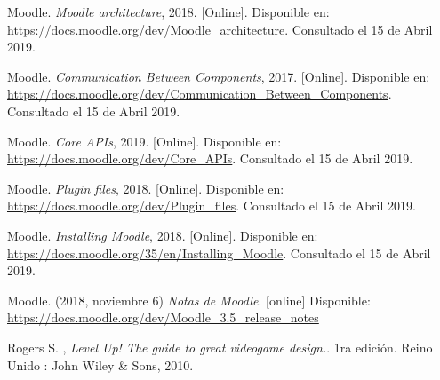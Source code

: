 \begin{thebibliography}{9}
        Moodle. {\it Moodle architecture}, 2018. [Online]. Disponible en:
        \url{https://docs.moodle.org/dev/Moodle_architecture}. Consultado el 15 de Abril 2019.
    
        Moodle. {\it Communication Between Components}, 2017. [Online]. Disponible en:
        \url{https://docs.moodle.org/dev/Communication_Between_Components}. Consultado el 15 de Abril 2019.
    
        Moodle. {\it Core APIs}, 2019. [Online]. Disponible en:
        \url{https://docs.moodle.org/dev/Core_APIs}. Consultado el 15 de Abril 2019.
    
        Moodle. {\it Plugin files}, 2018. [Online]. Disponible en:
        \url{https://docs.moodle.org/dev/Plugin_files}. Consultado el 15 de Abril 2019.

        Moodle. {\it Installing Moodle}, 2018. [Online]. Disponible en:
        \url{https://docs.moodle.org/35/en/Installing_Moodle}. Consultado el 15 de Abril 2019.

        Moodle. (2018, noviembre 6) \textit{Notas de Moodle}. [online] Disponible:
        \url{https://docs.moodle.org/dev/Moodle_3.5_release_notes}

        
\begin{comment}
    \bibitem{conceptoDJLogros}
        Blair, Lucas \& Bowers, Clint \& Cannon-Bowers, Janis \& Gonzalez-Holland, Emily. {\it Understanding the Role of Achievements in Game-Based Learning. International Journal of Serious Games.} , December 2016 
    
\end{comment}    
    
        Rogers S. , \textit{Level Up! The guide to great videogame design.}. 1ra edición. Reino Unido : John Wiley \& Sons, 2010. 
        

\end{thebibliography}

